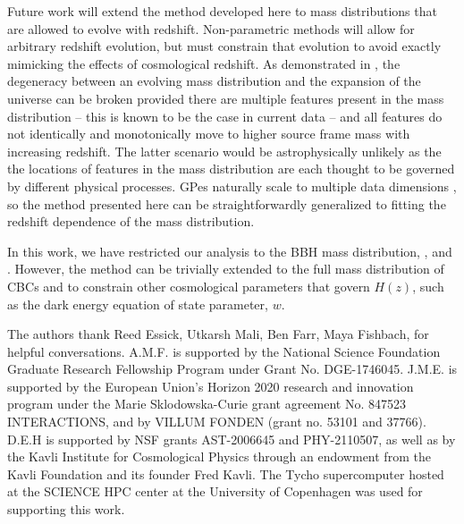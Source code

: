 \documentclass[]{aastex631}
\begin{document}
Future work  will extend the method developed here to mass distributions that are allowed to evolve with redshift.
Non-parametric methods will allow for arbitrary redshift evolution, but must constrain that evolution to avoid exactly mimicking the effects of cosmological redshift.
As demonstrated in \citet{ezquiaga_spectral_2022}, the degeneracy between an evolving mass distribution and the expansion of the universe can be broken provided there are multiple features present in the mass distribution -- this is known to be the case in current data \citep{abbott_population_2023} -- and all features do not identically and monotonically move to higher source frame mass with increasing redshift.
The latter scenario would be astrophysically unlikely as the the locations of features in the mass distribution are each thought to be governed by different physical processes.
\acl{GP}es naturally scale to multiple data dimensions , so the method presented here can be straightforwardly generalized to fitting the redshift dependence of the mass distribution. 

In this work, we have restricted our analysis to the \ac{BBH} mass distribution, \Ho, and \Omm.
However, the method can be trivially extended to the full mass distribution of \acp{CBC} \citep[e.g.]{matter matters, ezquiaga_spectral_2022, bridging gap,ray_non-parametric_2023} and to constrain other cosmological parameters that govern $H(z)$, such as the dark energy equation of state parameter, $w$. 

\begin{acknowledgments}
    The authors thank Reed Essick, Utkarsh Mali, Ben Farr, Maya Fishbach,  for helpful conversations. 
    A.M.F. is supported by the National Science Foundation Graduate Research Fellowship Program under Grant No. DGE-1746045.
    J.M.E. is supported by the European Union’s Horizon 2020 research and innovation program under the Marie Sklodowska-Curie grant agreement No. 847523 INTERACTIONS, and by VILLUM FONDEN (grant no. 53101 and 37766). 
    D.E.H is supported by NSF grants AST-2006645 and PHY-2110507, as well as by the Kavli Institute for Cosmological Physics through an endowment from the Kavli Foundation and its founder Fred Kavli.
    The Tycho supercomputer hosted at the SCIENCE HPC center at the University of Copenhagen was used for supporting this work.
\end{acknowledgments}
\end{document}
